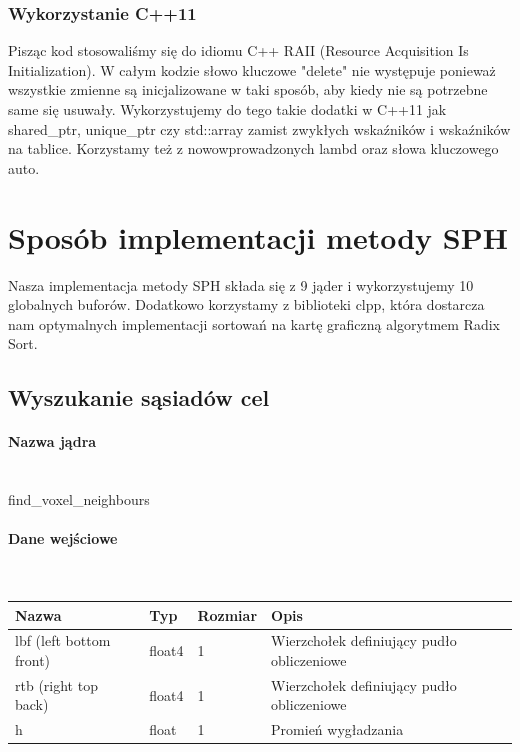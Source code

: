 \documentclass[polish, 12pt]{aghthesis}
\begin{document}
		\subsubsection{Wykorzystanie C++11}
		
		Pisząc kod stosowaliśmy się do idiomu C++ RAII (Resource Acquisition Is Initialization). W całym kodzie słowo kluczowe "delete" nie występuje ponieważ wszystkie zmienne są inicjalizowane w taki sposób, aby kiedy nie są potrzebne same się usuwały. Wykorzystujemy do tego takie dodatki w C++11 jak shared\_ptr, unique\_ptr czy std::array zamist zwykłych wskaźników i wskaźników na tablice. Korzystamy też z nowowprowadzonych lambd oraz słowa kluczowego auto.

\section{Sposób implementacji metody SPH}
Nasza implementacja metody SPH składa się z 9 jąder i wykorzystujemy 10 globalnych buforów. Dodatkowo korzystamy z biblioteki clpp, która dostarcza nam optymalnych implementacji sortowań na kartę graficzną algorytmem Radix Sort.
		
		\subsection{Wyszukanie sąsiadów cel}
			\paragraph{Nazwa jądra} \ \\
				find\_voxel\_neighbours
			\paragraph{Dane wejściowe} \ \\
					\begin{tabular}{| p{} | p{} | p{} | p{} |}
					\hline
						Nazwa & Typ & Rozmiar & Opis \\
					\hline
						lbf (left bottom front)& float4 & 1 & Wierzchołek definiujący pudło obliczeniowe \\ 
					\hline
						rtb (right top back) & float4 & 1 & Wierzchołek definiujący pudło obliczeniowe  \\ 
					\hline
						h & float & 1 & Promień wygładzania \\ 
					\hline
    				\end{tabular}
\end{document}
